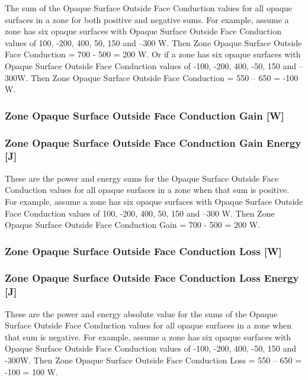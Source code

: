 The sum of the Opaque Surface Outside Face Conduction values for all opaque surfaces in a zone for both positive and negative sums. For example, assume a zone has six opaque surfaces with Opaque Surface Outside Face Conduction values of 100, -200, 400, 50, 150 and --300 W. Then Zone Opaque Surface Outside Face Conduction = 700 - 500 = 200 W. Or if a zone has six opaque surfaces with Opaque Surface Outside Face Conduction values of -100, -200, 400, -50, 150 and --300W. Then Zone Opaque Surface Outside Face Conduction = 550 -- 650 = -100 W.

\subsubsection{Zone Opaque Surface Outside Face Conduction Gain {[}W{]}}\label{zone-opaque-surface-outside-face-conduction-gain-w}

\subsubsection{Zone Opaque Surface Outside Face Conduction Gain Energy {[}J{]}}\label{zone-opaque-surface-outside-face-conduction-gain-energy-j}

These are the power and energy sums for the Opaque Surface Outside Face Conduction values for all opaque surfaces in a zone when that sum is positive. For example, assume a zone has six opaque surfaces with Opaque Surface Outside Face Conduction values of 100, -200, 400, 50, 150 and --300 W. Then Zone Opaque Surface Outside Face Conduction Gain = 700 - 500 = 200 W.

\subsubsection{Zone Opaque Surface Outside Face Conduction Loss {[}W{]}}\label{zone-opaque-surface-outside-face-conduction-loss-w}

\subsubsection{Zone Opaque Surface Outside Face Conduction Loss Energy {[}J{]}}\label{zone-opaque-surface-outside-face-conduction-loss-energy-j}

These are the power and energy absolute value for the sums of the Opaque Surface Outside Face Conduction values for all opaque surfaces in a zone when that sum is negative. For example, assume a zone has six opaque surfaces with Opaque Surface Outside Face Conduction values of -100, -200, 400, -50, 150 and -300W. Then Zone Opaque Surface Outside Face Conduction Loss = \textbar{}550 -- 650\textbar{} = \textbar{}-100\textbar{} = 100 W.

